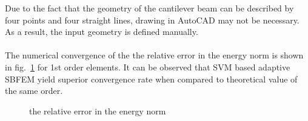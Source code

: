 Due to the fact that the geometry of the cantilever beam can be described by four points and four straight lines, drawing in AutoCAD may not be necessary.
As a result, the input geometry is defined manually.


\paragraph{}
The numerical convergence of the the relative error in the energy norm is shown in fig.~\ref{adap_fig:ex_short_cantilever_convergence} for 1st order elements.
It can be observed that SVM based adaptive SBFEM yield superior convergence rate when compared to theoretical value of the same order.

\begin{figure}[h!]
    \centering
    \caption{the relative error in the energy norm}
    \label{adap_fig:ex_short_cantilever_convergence}
\end{figure}


